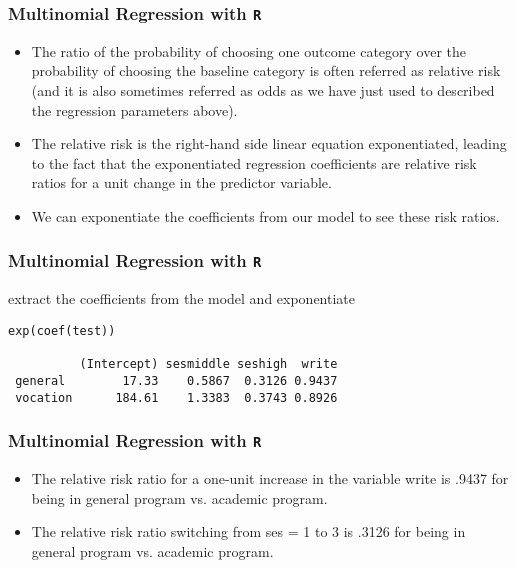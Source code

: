 \documentclass[00-GLMregslides.tex]{subfiles}
\begin{document}
	
\newpage
	
\Large
	


\begin{frame}[fragile]

\frametitle{Multinomial Regression with \texttt{R}}
\Large
\begin{itemize}
\item The ratio of the probability of choosing one outcome category over the probability of choosing the baseline category is often referred as 
relative risk (and it is also sometimes referred as odds as we have just used to described the regression parameters above). 
\item  The relative risk is the right-hand side linear equation exponentiated, leading to the fact that the 
exponentiated regression coefficients are relative risk ratios for a unit change in the predictor variable. 
\item  We can exponentiate the coefficients from our model to see these risk ratios. 
\end{itemize}
\end{frame}
\begin{frame}[fragile]

\frametitle{Multinomial Regression with \texttt{R}}
\Large

extract the coefficients from the model and exponentiate
\begin{framed}
\begin{verbatim}
exp(coef(test))
 
          (Intercept) sesmiddle seshigh  write
 general        17.33    0.5867  0.3126 0.9437
 vocation      184.61    1.3383  0.3743 0.8926
\end{verbatim}
\end{framed}
\end{frame}
\begin{frame}[fragile]

\frametitle{Multinomial Regression with \texttt{R}}
\Large
\begin{itemize}
\item The relative risk ratio for a one-unit increase in the variable write is .9437 for being in general program vs. academic program. 
\item The relative risk ratio switching from ses = 1 to 3 is .3126 for being in general program vs. academic program. 
\end{itemize}
\end{frame}
\end{document}
